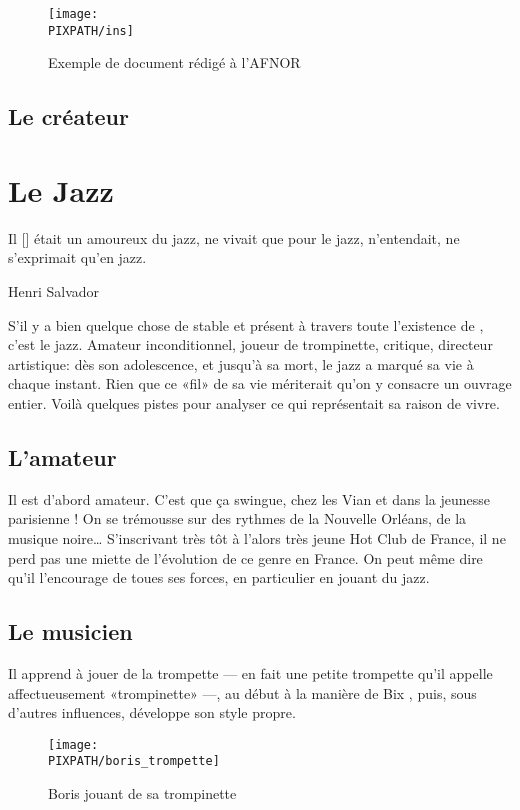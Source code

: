 \begin{figure}
\centering
\texttt{[image: \\PIXPATH/ins]}
\caption{Exemple de document rédigé à l'AFNOR}
\label{ins}
\end{figure}

\subsection{Le créateur}

\section{Le Jazz}
\epigraph{Il [\BV] était un amoureux du jazz, ne vivait que pour le jazz, n'entendait, ne s'exprimait qu'en jazz.}
{Henri Salvador}

S'il y a bien quelque chose de stable et présent à travers toute l'existence de \BV, c'est le jazz.
Amateur inconditionnel, joueur de trompinette, critique, directeur artistique: dès son adolescence, et
jusqu'à sa mort, le jazz a marqué sa vie à chaque instant. Rien que ce «fil» de sa vie mériterait
qu'on y consacre un ouvrage entier. Voilà quelques pistes pour analyser ce qui représentait
sa raison de vivre.

\subsection{L'amateur}

Il est d'abord amateur. C'est que ça swingue, chez les Vian et dans la jeunesse parisienne !
On se trémousse sur des rythmes de la Nouvelle Orléans, de la musique noire\ldots
S'inscrivant très tôt à l'alors très jeune Hot Club de France, il ne perd
pas une miette de l'évolution de ce genre en France. On peut même dire
qu'il l'encourage de toues ses forces, en particulier en jouant du jazz.

\subsection{Le musicien}

Il apprend à jouer de la trompette --- en fait une petite trompette qu'il appelle affectueusement «trompinette» ---,
au début à la manière de Bix , puis, sous d'autres influences, développe
son style propre.

\begin{figure}
\centering
\texttt{[image: \\PIXPATH/boris\_trompette]}
\caption{Boris jouant de sa trompinette}
\end{figure}

